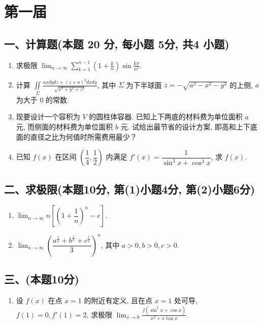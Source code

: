 \section{第一届}
\subsection*{一、计算题(本题 20 分,  每小题 5分,  共4 小题)}
\begin{enumerate}
    \item 求极限 $\displaystyle\lim_{n\rightarrow\infty}\displaystyle\sum_{k=1}^{n-1}\left(1+\frac{k}{n}\right)\sin\frac{k\pi}{n^2}$.
    \item 计算 $\displaystyle\iint\limits_{\Sigma}\frac{axdydz+(z+a)^2dxdy}{\sqrt{x^2+y^2+z^2}}$, 其中 $\Sigma$ 为下半球面 $z=-\sqrt{a^2-x^2-y^2}$ 的上侧, $a$ 为大于 0 的常数.
    \item 现要设计一个容积为 $V$ 的圆柱体容器. 已知上下两底的材料费为单位面积 $a$ 元, 而侧面的材料费为单位面积 $b$ 元. 试给出最节省的设计方案, 即高和上下底面的直径之比为何值时所需费用最少？
    \item 已知 $f(x)$ 在区间 $\left(\dfrac{1}{4},\dfrac{1}{2}\right)$ 内满足 $f'(x)=\dfrac{1}{\sin^3x+\cos^3x}$, 求 $f(x)$.
\end{enumerate}

\subsection*{二、求极限(本题10分, 第(1)小题4分, 第(2)小题6分)}
\begin{enumerate}[start=5]
    \item $\displaystyle\lim_{n\rightarrow\infty}n\left[\left(1+\dfrac{1}{n}\right)^n-e\right]$.
    \item $\displaystyle\lim_{n\rightarrow\infty}\left(\dfrac{a^{\frac{1}{n}}+b^{\frac{1}{n}}+c^{\frac{1}{n}}}{3}\right)^n$, 其中 $a>0,b>0,c>0$.
\end{enumerate}

\subsection*{三、(本题10分)}
\begin{enumerate}[start=7]
    \item 设 $f(x)$ 在点 $x=1$ 的附近有定义, 且在点 $x=1$ 处可导, $f(1)=0, f'(1)=2$, 求极限
          $\displaystyle\lim_{x\rightarrow 0}\frac{f(\sin^2 x+\cos x)}{x^2+x\tan x}.$
\end{enumerate}

